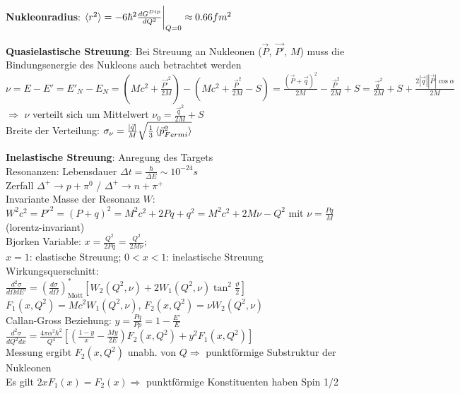 \documentclass[10pt,twoside,a4paper]{article}
\begin{document}
\begin{multicols*}{3}
\textbf{Nukleonradius}: $\braket{r^2} = -6 \hbar^2 \frac{dG^{Dip}}{dQ^2}\bigg|_{Q=0} \approx 0.66 fm^2$

\textbf{Quasielastische Streuung}: Bei Streuung an Nukleonen ($\vec{P}$, $\vec{P'}$, $M$) muss die Bindungsenergie des Nukleons auch betrachtet werden \\
$\nu = E - E' = E'_N - E_N = (M c^2 + \frac{\vec{P'}^2}{2 M}) - (M c^2 + \frac{\vec{P}^2}{2 M} - S) = \frac{(\vec{P} + \vec{q})^2}{2 M} - \frac{\vec{P}^2}{2 M} + S = \frac{\vec{q}^2}{2 M} + S + \frac{2 |\vec{q}| |\vec{P}| \cos \alpha}{2 M}$ \\
$\Rightarrow$ $\nu$ verteilt sich um Mittelwert $\nu_0 = \frac{\vec{q}^2}{2 M} + S$ \\
Breite der Verteilung: $\sigma_{\nu} = \frac{|\vec{q}|}{M} \sqrt{\frac{1}{3} \braket{\vec{p}^2_{Fermi}}}$

\textbf{Inelastische Streuung}: Anregung des Targets \\
Resonanzen: Lebensdauer $\Delta t = \frac{\hbar}{\Delta E} \sim 10^{-24} s$ \\
Zerfall $\Delta^+ \to p + \pi^0$ / $\Delta^+ \to n + \pi^+$ \\
Invariante Masse der Resonanz $W$: $W^2 c^2 = P'^2 = (P + q)^2 = M^2 c^2 + 2 P q + q^2 = M^2 c^2 + 2 M \nu - Q^2$ mit $\nu = \frac{P q}{M}$ (lorentz-invariant) \\
Bjorken Variable: $x=\frac{Q^2}{2 P q} = \frac{Q^2}{2 M \nu}$; \\
$x=1$: elastische Streuung; $0<x<1$: inelastische Streuung \\
Wirkungsquerschnitt: \\
$\frac{d^2 \sigma}{d\Omega dE'} = \left( \frac{d\sigma}{d\Omega} \right)^*_{\text{Mott}} \left[ W_2(Q^2, \nu) + 2 W_1(Q^2, \nu) \tan^2 \frac{\vartheta}{2} \right]$ \\
$F_1(x,Q^2) = M c^2 W_1(Q^2, \nu)$, $F_2(x,Q^2) = \nu W_2(Q^2, \nu)$ \\
Callan-Gross Beziehung: $y = \frac{P q}{P p} = 1 - \frac{E'}{E}$ \\
$\frac{d^2\sigma}{dQ^2 dx} = \frac{4 \pi \alpha^2 \hbar^2}{Q^4} \left[ \left( \frac{1-y}{x} - \frac{M y}{2 E} \right) F_2(x,Q^2) + y^2 F_1(x,Q^2) \right]$ \\
Messung ergibt $F_2(x,Q^2)$ unabh. von $Q \Rightarrow$ punktförmige Substruktur der Nukleonen \\
Es gilt $2 x F_1(x) = F_2(x) \Rightarrow$ punktförmige Konstituenten haben Spin 1/2


\end{multicols*}
\end{document}

